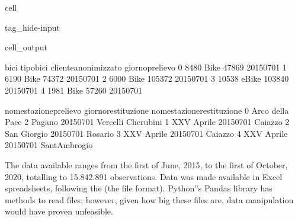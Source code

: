 \documentclass[letterpaper,10pt,english]{jupyterBook}
\begin{document}
\begin{sphinxuseclass}{cell}
\begin{sphinxuseclass}{tag_hide-input}
\begin{sphinxuseclass}{cell_output}
\begin{sphinxVerbatim}[commandchars=\\\{\}]
    bici tipo\PYGZus{}bici  cliente\PYGZus{}anonimizzato giorno\PYGZus{}prelievo  \PYGZbs{}
0   8480      Bike                 47869      2015\PYGZhy{}07\PYGZhy{}01   
1   6190      Bike                 74372      2015\PYGZhy{}07\PYGZhy{}01   
2   6000      Bike                105372      2015\PYGZhy{}07\PYGZhy{}01   
3  10538     eBike                103840      2015\PYGZhy{}07\PYGZhy{}01   
4   1981      Bike                 57260      2015\PYGZhy{}07\PYGZhy{}01   

       nome\PYGZus{}stazione\PYGZus{}prelievo giorno\PYGZus{}restituzione nome\PYGZus{}stazione\PYGZus{}restituzione  
0  Arco della Pace 2 \PYGZhy{} Pagano          2015\PYGZhy{}07\PYGZhy{}01       Vercelli \PYGZhy{} Cherubini  
1                  XXV Aprile          2015\PYGZhy{}07\PYGZhy{}01                    Caiazzo  
2                 San Giorgio          2015\PYGZhy{}07\PYGZhy{}01                    Rosario  
3                  XXV Aprile          2015\PYGZhy{}07\PYGZhy{}01                    Caiazzo  
4                  XXV Aprile          2015\PYGZhy{}07\PYGZhy{}01              Sant\PYGZsq{}Ambrogio  
\end{sphinxVerbatim}

\end{sphinxuseclass}
\end{sphinxuseclass}
\end{sphinxuseclass}
\sphinxAtStartPar
The data available ranges from the first of June, 2015, to the first of October, 2020, totalling to 15.842.891 observations. Data was made available in Excel spreadsheets, following the  (the  file format). Python”s Pandas library has methods to read  files; however, given how big these files are, data manipulation would have proven unfeasible.
\end{document}
